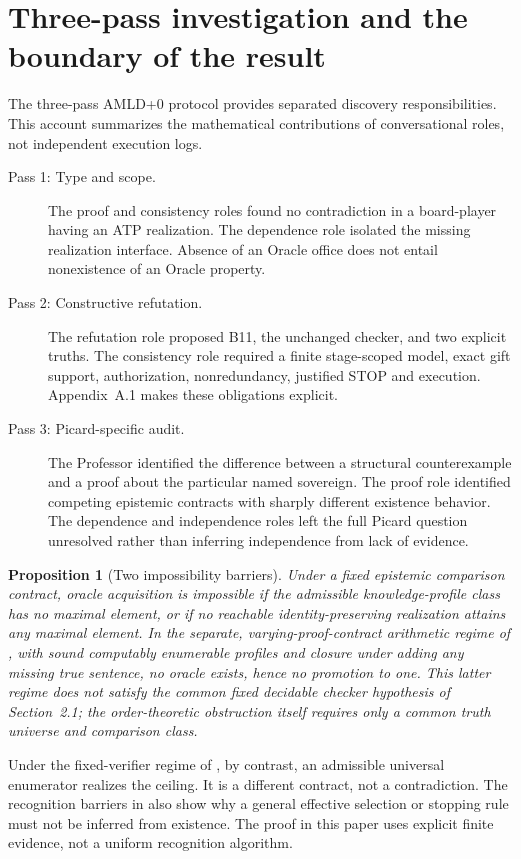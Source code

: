 \documentclass[11pt]{article}
\newtheorem{proposition}[theorem]{Proposition}
\theoremstyle{definition}\newtheorem{definition}[theorem]{Definition}
\begin{document}
\section{Three-pass investigation and the boundary of the result}
The three-pass AMLD+0 protocol \cite{bus} provides separated discovery responsibilities. This account summarizes the mathematical contributions of conversational roles, not independent execution logs.
\begin{description}
\item[Pass 1: Type and scope.] The proof and consistency roles found no contradiction in a board-player having an ATP realization. The dependence role isolated the missing realization interface. Absence of an Oracle office does not entail nonexistence of an Oracle property.
\item[Pass 2: Constructive refutation.] The refutation role proposed B11, the unchanged checker, and two explicit truths. The consistency role required a finite stage-scoped model, exact gift support, authorization, nonredundancy, justified STOP and execution. Appendix~A.1 makes these obligations explicit.
\item[Pass 3: Picard-specific audit.] The Professor identified the difference between a structural counterexample and a proof about the particular named sovereign. The proof role identified competing epistemic contracts with sharply different existence behavior. The dependence and independence roles left the full Picard question unresolved rather than inferring independence from lack of evidence.
\end{description}
\begin{proposition}[Two impossibility barriers]\label{thm:barriers}
Under a fixed epistemic comparison contract, oracle acquisition is impossible if the admissible knowledge-profile class has no maximal element, or if no reachable identity-preserving realization attains any maximal element. In the separate, varying-proof-contract arithmetic regime of \cite[Thm.~5.3]{oracle}, with sound computably enumerable profiles and closure under adding any missing true sentence, no oracle exists, hence no promotion to one. This latter regime does not satisfy the common fixed decidable checker hypothesis of Section~2.1; the order-theoretic obstruction itself requires only a common truth universe and comparison class.
\end{proposition}
\noindent Under the fixed-verifier regime of \cite[Cor.~5.2]{oracle}, by contrast, an admissible universal enumerator realizes the ceiling. It is a different contract, not a contradiction. The recognition barriers in \cite[Sec.~6]{oracle} also show why a general effective selection or stopping rule must not be inferred from existence. The proof in this paper uses explicit finite evidence, not a uniform recognition algorithm.
\end{document}
